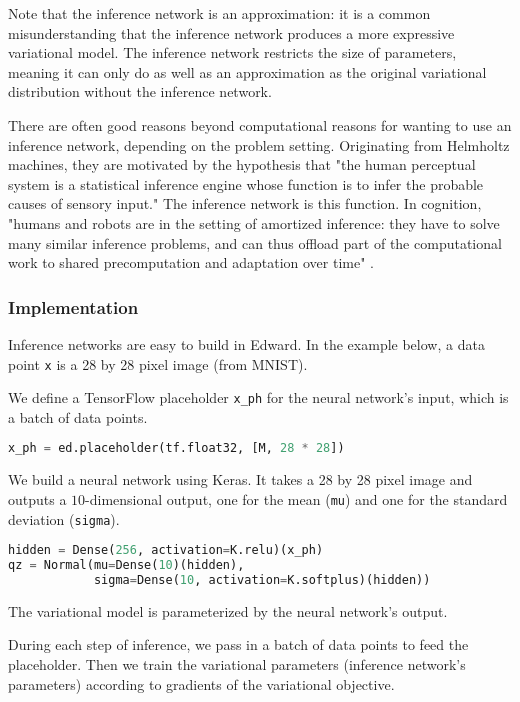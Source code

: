 Note that the inference network is an approximation: it is a common
misunderstanding that the inference network produces a more expressive
variational model. The inference network restricts the size of
parameters, meaning it can only do as well as an approximation as the
original variational distribution without the inference network.

There are often good reasons beyond computational reasons
for wanting to use an inference network, depending on the problem
setting.
Originating from
Helmholtz machines, they are motivated by the hypothesis
that "the human perceptual system is a statistical inference engine
whose function is to infer the probable causes of sensory input." The
inference network is this function.
In cognition, "humans and robots are in the setting of amortized
inference: they have to solve many similar inference problems, and can
thus offload part of the computational work to shared precomputation
and adaptation over time" \citep{stuhlmuller2013learning}.

\subsubsection{Implementation}

Inference networks are easy to build in Edward.
In the example below, a data point \texttt{x} is a 28 by 28 pixel
image (from MNIST).

We define a TensorFlow placeholder \texttt{x_ph} for the neural
network's input, which is a batch of data points.
\begin{lstlisting}[language=Python]
x_ph = ed.placeholder(tf.float32, [M, 28 * 28])
\end{lstlisting}

We build a neural network using Keras.
It takes a 28 by 28 pixel image and outputs a $10$-dimensional
output, one for the mean (\texttt{mu}) and one for the standard
deviation (\texttt{sigma}).
\begin{lstlisting}[language=Python]
hidden = Dense(256, activation=K.relu)(x_ph)
qz = Normal(mu=Dense(10)(hidden),
            sigma=Dense(10, activation=K.softplus)(hidden))
\end{lstlisting}
The variational model is parameterized by the neural network's
output.

During each step of inference, we pass in a batch of data points to feed the
placeholder. Then we train the variational parameters (inference
network's parameters) according to
gradients of the variational objective.

